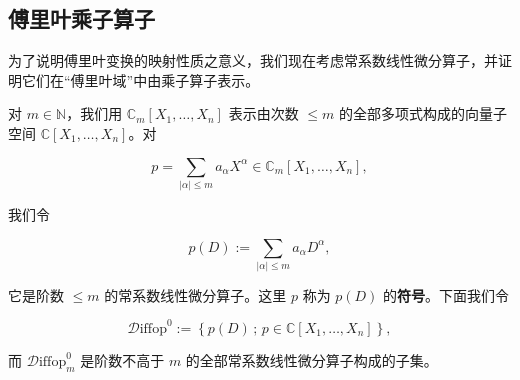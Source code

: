 \subsection*{傅里叶乘子算子}

为了说明傅里叶变换的映射性质之意义，我们现在考虑常系数线性微分算子，并证明它们在“傅里叶域”中由乘子算子表示。

对 $ m \in \mathbb{N} $，我们用 $ \mathbb{C}_m[X_1,\ldots,X_n] $ 表示由次数 $ \le m $ 的全部多项式构成的向量子空间 $ \mathbb{C}[X_1,\ldots,X_n] $。对

\[
p = \sum_{|\alpha|\le m}a_\alpha X^\alpha \in \mathbb{C}_m[X_1,\ldots,X_n] ,
\]

我们令

\[
p(D) := \sum_{|\alpha|\le m}a_\alpha D^\alpha ,
\]

它是阶数 $ \le m $ 的常系数线性微分算子。这里 $ p $ 称为 $ p(D) $ 的\textbf{符号}。下面我们令

\[
\mathcal{D}\mathrm{iffop}^0 := \left\{ p(D) \,;\, p \in \mathbb{C}[X_1,\ldots,X_n] \right\} ,
\]

而 $ \mathcal{D}\mathrm{iffop}^0_m $ 是阶数不高于 $ m $ 的全部常系数线性微分算子构成的子集。

